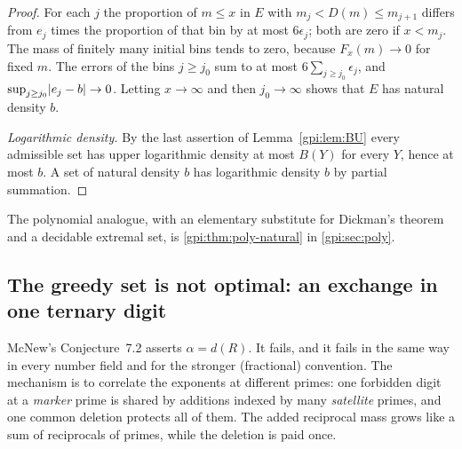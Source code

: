 \begin{proof}
For each $j$ the proportion of $m\le x$ in $E$ with $m_j<D(m)\le m_{j+1}$ differs from $e_j$
times the proportion of that bin by at most $6\epsilon_j$; both are zero if $x<m_j$. The mass
of finitely many initial bins tends to zero, because $F_x(m)\to0$ for fixed $m$. The errors
of the bins $j\ge j_0$ sum to at most $6\sum_{j\ge j_0}\epsilon_j$, and
$\sup_{j\ge j_0}\lvert e_j-b\rvert\to0$. Letting $x\to\infty$ and then $j_0\to\infty$ shows that $E$
has natural density $b$.

\emph{Logarithmic density.} By the last assertion of Lemma~\ref{gpi:lem:BU} every admissible set
has upper logarithmic density at most $B(Y)$ for every $Y$, hence at most $b$. A set of
natural density $b$ has logarithmic density $b$ by partial summation.
\end{proof}

The polynomial analogue, with an elementary substitute for Dickman's theorem and a decidable
extremal set, is \cref{gpi:thm:poly-natural} in \cref{gpi:sec:poly}.

\subsection{The greedy set is not optimal: an exchange in one ternary digit}\label{gpi:sec:onedigit}
{\raggedright{}}

McNew's Conjecture~7.2 asserts $\alpha=d(R)$. It fails, and it fails in the same way in every
number field and for the stronger (fractional) convention. The mechanism is to correlate the
exponents at different primes: one forbidden digit at a \emph{marker} prime is shared by
additions indexed by many \emph{satellite} primes, and one common deletion protects all of
them. The added reciprocal mass grows like a sum of reciprocals of primes, while the
deletion is paid once.

